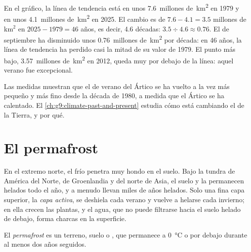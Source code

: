 \begin{example}
En el gráfico, la línea de tendencia está en unos
\num{7.6}~millones de~\unit{km^2} en 1979 y en unos
\num{4.1}~millones de~\unit{km^2} en 2025. El cambio es de $7.6 - 4.1 =
3.5$ millones de km$^2$ en $2025 - 1979 = 46$ años, es decir, 4.6 décadas:
$3.5 \div 4.6 \approx 0.76$. El  de septiembre ha disminuido
unos \num{0.76}~millones de~\unit{km^2} por década: en 46 años, la línea
de tendencia ha perdido casi la mitad de su valor de 1979. El punto más
bajo, \num{3.57}~millones de~\unit{km^2} en 2012, queda muy por debajo de
la línea: aquel verano fue excepcional.
\end{example}

Las medidas muestran que el  de verano del Ártico se ha vuelto
a la vez más pequeño y más fino desde la década de 1980, a medida que el
Ártico se ha calentado. El \cref{ch:g9:climate-past-and-present} estudia
cómo está cambiando el  de la Tierra, y por qué.

\section{El permafrost}

En el extremo norte, el frío penetra muy hondo en el suelo. Bajo la
tundra de América del Norte, de Groenlandia y del norte de Asia, el suelo
y la  permanecen helados todo el año, y a menudo llevan miles de años
helados. Solo una fina capa superior, la \emph{capa activa}, se deshiela
cada verano y vuelve a helarse cada invierno; en ella crecen las plantas,
y el agua, que no puede filtrarse hacia el suelo helado de debajo, forma
charcas en la superficie.

\begin{definition}[Permafrost]\label{def:g8:ice-on-earth:permafrost}
El \emph{permafrost} es un terreno, suelo o , que
permanece a \qty{0}{\degreeCelsius} o por debajo durante al menos dos años
seguidos.
\end{definition}

